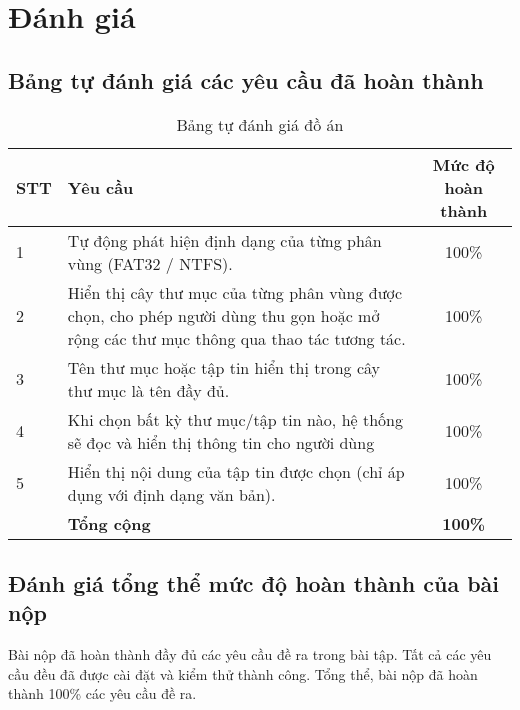 \section{Đánh giá}
\subsection{Bảng tự đánh giá các yêu cầu đã hoàn thành}

\begin{center}
  \begin{table}[H]
    \centering
    \caption{Bảng tự đánh giá đồ án}
    \renewcommand{\arraystretch}{1.4}
    \begin{tabular}{|l|p{}|c|}
      \hline
      \textbf{STT} & \textbf{Yêu cầu}                                                                                                                      & \textbf{Mức độ hoàn thành} \\ \hline
      1            & Tự động phát hiện định dạng của từng phân vùng (FAT32 / NTFS).                                                                        & 100\%                      \\ \hline
      2            & Hiển thị cây thư mục của từng phân vùng được chọn, cho phép người dùng thu gọn hoặc mở rộng các thư mục thông qua thao tác tương tác.
                   & 100\%                                                                                                                                                              \\ \hline
      3            & Tên thư mục hoặc tập tin hiển thị trong cây thư mục là tên đầy đủ.
                   & 100\%                                                                                                                                                              \\ \hline
      4            & Khi chọn bất kỳ thư mục/tập tin nào, hệ thống sẽ đọc và hiển thị thông tin cho người dùng
                   & 100\%                                                                                                                                                              \\ \hline
      5            & Hiển thị nội dung của tập tin được chọn (chỉ áp dụng với định dạng văn bản).                                                          & 100\%                      \\ \hline
                   & \textbf{Tổng cộng}                                                                                                                    & \textbf{100\%}             \\ \hline
    \end{tabular}
    \label{tab:mytable}
  \end{table}
\end{center}






\subsection{Đánh giá tổng thể mức độ hoàn thành của bài nộp}

Bài nộp đã hoàn thành đầy đủ các yêu cầu đề ra trong bài tập. Tất cả các yêu cầu đều đã được cài đặt và kiểm thử thành công. Tổng thể, bài nộp đã hoàn thành 100\% các yêu cầu đề ra.
